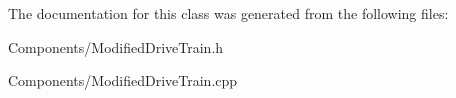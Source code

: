\-The documentation for this class was generated from the following files\-:\begin{DoxyCompactItemize}
\item 
\-Components/\-Modified\-Drive\-Train.\-h\item 
\-Components/\-Modified\-Drive\-Train.\-cpp\end{DoxyCompactItemize}
